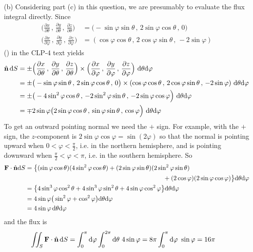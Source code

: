 \begin{solution}
\noindent (b) Considering part (c) in this question, we are presumably
to evaluate the flux integral directly.
Since
\begin{align*}
\Big(\frac{\partial x}{\partial\theta}\,,\,
      \frac{\partial y}{\partial\theta}\,,\,
      \frac{\partial z}{\partial\theta}\Big)
&=\big(-\sin\varphi\sin\theta\,,\,
       2\sin\varphi\cos\theta\,,\,0\big)\\
\Big(\frac{\partial x}{\partial\varphi}\,,\,\frac{\partial y}{\partial\varphi}
             \,,\, \frac{\partial z}{\partial\varphi}\Big)
&=(\cos\varphi\cos\theta\,,\,2\cos\varphi\sin\theta\,,\,-2\sin\varphi) 
\end{align*}
() in the CLP-4 text yields
\begin{align*}
\hat{\mathbf{n}}\,\mathrm{d}S
&=\pm\Big(\frac{\partial x}{\partial\theta}\,,\,
          \frac{\partial y}{\partial\theta}\,,\,
          \frac{\partial z}{\partial\theta}\Big)
\times
\Big(\frac{\partial x}{\partial\varphi}\,,\,\frac{\partial y}{\partial\varphi}
   \,,\, \frac{\partial z}{\partial\varphi}\Big)
\ \mathrm{d}\theta\mathrm{d}\varphi\\
&=\pm \big(-\sin\varphi\sin\theta\,,\,
       2\sin\varphi\cos\theta\,,\,0\big)
\times
(\cos\varphi\cos\theta\,,\,2\cos\varphi\sin\theta\,,\,-2\sin\varphi)
\ \mathrm{d}\theta\mathrm{d}\varphi\\
&=\pm\big(-4\sin^2\varphi\cos\theta\,,\,
          -2\sin^2\varphi\sin\theta\,,\,
          -2\sin\varphi\cos\varphi\Big)\ \mathrm{d}\theta\mathrm{d}\varphi \\
&=\mp 2\sin\varphi \big(2\sin\varphi\cos\theta\,,\,
          \sin\varphi\sin\theta\,,\,
          \cos\varphi\Big)\ \mathrm{d}\theta\mathrm{d}\varphi 
\end{align*}
To get an outward pointing normal we need the $+$ sign. For example, with the
$+$ sign, the $z$-component is $2\sin\varphi\cos\varphi
=\sin(2\varphi)$ so that the normal is pointing upward when
$0<\varphi<\frac{\pi}{2}$, i.e. in the northern hemisphere,
and is pointing downward when $\frac{\pi}{2}<\varphi<\pi$, i.e.
in the southern hemisphere. So
\begin{align*}
\vF\cdot\hn\dee{S} 
&=\big\{
     (\sin\varphi\cos\theta)(4\sin^2\varphi\cos\theta)
     + (2\sin\varphi\sin\theta)(2\sin^2\varphi\sin\theta) \\&\hskip3in
     + (2\cos\varphi)(2\sin\varphi\cos\varphi)
  \big\}\dee{\theta}\dee{\varphi} \\
&=\big\{4\sin^3\varphi\cos^2\theta
  +4\sin^3\varphi\sin^2\theta
  +4\sin\varphi\cos^2\varphi\big\}\dee{\theta}\dee{\varphi} \\
 &=4\sin\varphi \big(\sin^2\varphi +\cos^2\varphi\big)
                \dee{\theta}\dee{\varphi}\\
 &=4\sin\varphi\,\dee{\theta}\dee{\varphi}
\end{align*}
and the flux is
\begin{align*}
\iint_S \mathbf{F}\cdot\hat{\mathbf{n}}\, \mathrm{d}S
&=\int_0^\pi\mathrm{d}\varphi\int_0^{2\pi}\mathrm{d}\theta\ 4\sin\varphi
 =8\pi \int_0^\pi \mathrm{d}\varphi\ \sin\varphi
=16\pi
\end{align*}


\end{solution}
